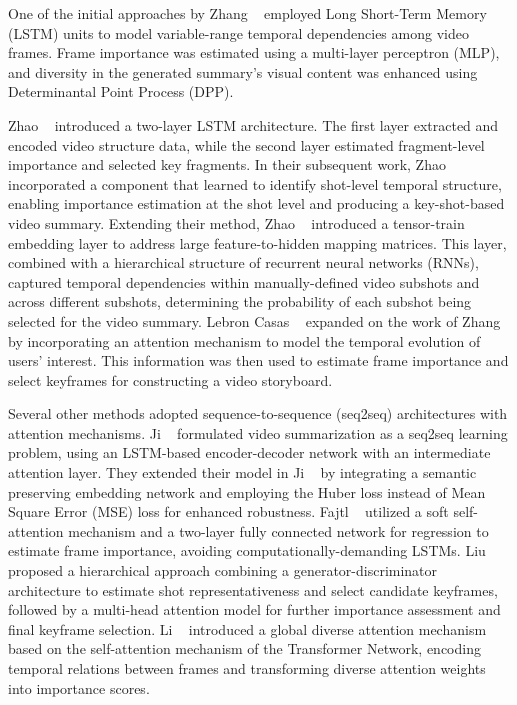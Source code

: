 		One of the initial approaches by Zhang \etal~\cite{zhang2016lstm} employed Long Short-Term Memory (LSTM) units to model variable-range temporal dependencies among video frames. Frame importance was estimated using a multi-layer perceptron (MLP), and diversity in the generated summary's visual content was enhanced using Determinantal Point Process (DPP).
		
		Zhao \etal~\cite{zhao2017hierarchical} introduced a two-layer LSTM architecture. The first layer extracted and encoded video structure data, while the second layer estimated fragment-level importance and selected key fragments. In their subsequent work, Zhao \etal~\cite{zhao2018hsa} incorporated a component that learned to identify shot-level temporal structure, enabling importance estimation at the shot level and producing a key-shot-based video summary. Extending their method, Zhao \etal~\cite{zhao2020tth} introduced a tensor-train embedding layer to address large feature-to-hidden mapping matrices. This layer, combined with a hierarchical structure of recurrent neural networks (RNNs), captured temporal dependencies within manually-defined video subshots and across different subshots, determining the probability of each subshot being selected for the video summary. Lebron Casas \etal~\cite{lebron2019attention} expanded on the work of Zhang \etal~\cite{zhang2016lstm} by incorporating an attention mechanism to model the temporal evolution of users' interest. This information was then used to estimate frame importance and select keyframes for constructing a video storyboard.
		
		Several other methods adopted sequence-to-sequence (seq2seq) architectures with attention mechanisms. Ji \etal~\cite{ji2019attentionEnDe} formulated video summarization as a seq2seq learning problem, using an LSTM-based encoder-decoder network with an intermediate attention layer. They extended their model in Ji \etal~\cite{ji2020deep} by integrating a semantic preserving embedding network and employing the Huber loss instead of Mean Square Error (MSE) loss for enhanced robustness. Fajtl \etal~\cite{fajtl2019summarizing} utilized a soft self-attention mechanism and a two-layer fully connected network for regression to estimate frame importance, avoiding computationally-demanding LSTMs. Liu \etal~\cite{liu2019learning} proposed a hierarchical approach combining a generator-discriminator architecture to estimate shot representativeness and select candidate keyframes, followed by a multi-head attention model for further importance assessment and final keyframe selection. Li \etal~\cite{li2021exploring} introduced a global diverse attention mechanism based on the self-attention mechanism of the Transformer Network, encoding temporal relations between frames and transforming diverse attention weights into importance scores.
		
